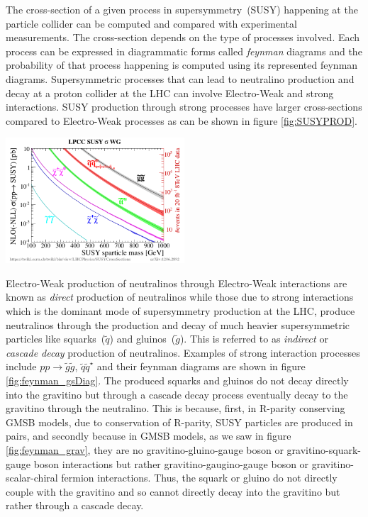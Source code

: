{The cross-section of a given process in supersymmetry~(SUSY) happening at the particle collider can be computed and compared with experimental measurements. The cross-section depends on the type of processes involved. Each process can be expressed in diagrammatic forms called \textit{feynman} diagrams and the probability of that process happening is computed using its represented feynman diagrams.
Supersymmetric processes that can lead to neutralino production and decay at a proton collider at the LHC can involve Electro-Weak and strong interactions. SUSY production through strong processes have larger cross-sections compared to Electro-Weak processes as can be shown in figure \ref{fig:SUSYPROD}. 
\begin{center}
\mbox{\includegraphics[height=0.5\textwidth,width=0.5\textwidth]{THESISPLOTS/SUSY_Xsec.png}}
\label{fig:SUSYPROD}
\end{center}
Electro-Weak production of neutralinos through Electro-Weak interactions are known as \textit{direct} production of neutralinos while those due to strong interactions which is the dominant mode of supersymmetry production at the LHC, produce neutralinos through the production and decay of much heavier supersymmetric particles like squarks~($\tilde{q}$) and gluinos~($\tilde{g}$). This is referred to as \textit{indirect} or \textit{cascade decay} production of neutralinos. Examples of strong interaction processes include $pp \rightarrow \tilde{g}\tilde{g}$, $\tilde{q}\tilde{q}^{\star}$ and their feynman diagrams are shown in figure \ref{fig:feynman_gsDiag}. The produced squarks and gluinos do not decay directly into the gravitino but through a cascade decay process eventually decay to the gravitino through the neutralino. This is because, first, in R-parity conserving GMSB models, due to conservation of R-parity, SUSY particles are produced in pairs, and secondly because in GMSB models, as we saw in figure \ref{fig:feynman_grav}, they are no gravitino-gluino-gauge boson or gravitino-squark-gauge boson interactions but rather gravitino-gaugino-gauge boson or gravitino-scalar-chiral fermion interactions. Thus, the squark or gluino do not directly couple with the gravitino and so cannot directly decay into the gravitino but rather through a cascade decay. 
}
